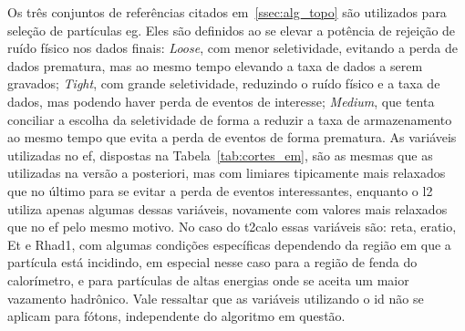 
Os três conjuntos de referências citados em~\ref{ssec:alg_topo} são utilizados para 
seleção de partículas \gls{eg}. Eles são definidos ao se elevar a potência de rejeição 
de ruído físico nos dados finais: \emph{Loose}, com menor seletividade, 
evitando a perda de dados prematura, mas ao mesmo tempo elevando a taxa de dados 
a serem gravados; \emph{Tight}, com grande seletividade, reduzindo o
ruído físico e a taxa de dados, mas podendo haver perda de eventos de interesse;
\emph{Medium}, que tenta conciliar a escolha da seletividade de forma
a reduzir a taxa de armazenamento ao mesmo tempo que evita a perda de eventos
de forma prematura. As variáveis utilizadas no \gls{ef}, dispostas na
Tabela~\ref{tab:cortes_em}, são as mesmas que as
utilizadas na versão a posteriori, mas com limiares tipicamente mais relaxados
que no último para se evitar a perda de eventos interessantes, enquanto o
\gls{l2} utiliza apenas algumas dessas variáveis, novamente com valores mais relaxados que no 
\gls{ef} pelo mesmo motivo. No caso do \gls{t2calo} essas variáveis são: \gls{reta}, 
\gls{eratio}, \gls{Et} e \gls{Rhad1}, com algumas condições específicas 
dependendo da região em que a partícula está incidindo, em especial nesse 
caso para a região de fenda do calorímetro, e para partículas de altas energias onde se aceita um maior
vazamento hadrônico. Vale ressaltar que as variáveis utilizando o \gls{id} 
não se aplicam para fótons, independente do algoritmo em questão.


